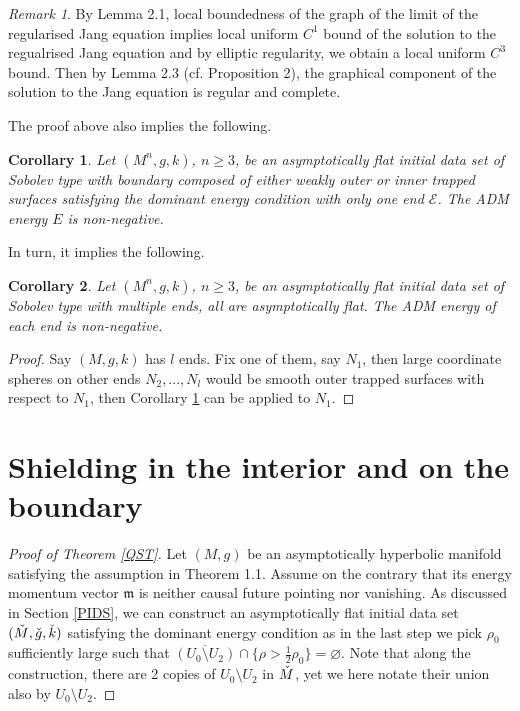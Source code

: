 \documentclass[11pt]{amsart}
\newtheorem{cor}{Corollary}[section]
\theoremstyle{remark}
\newtheorem{rem}{Remark}[section]
\numberwithin{equation}{section}
\def\m{\mathfrak{m}}
\begin{document}
{{\begin{rem}
By \cite{E10} Lemma 2.1, local boundedness of the graph of the limit of the regularised Jang equation implies local uniform $C^1$ bound of the solution to the regualrised Jang equation and by elliptic regularity, we obtain a local uniform $C^3$ bound. Then by \cite{E10} Lemma 2.3 (cf. \cite{SY2} Proposition 2), the graphical component of the solution to the Jang equation is regular and complete.  
\end{rem}

The proof above also implies the following. 
\begin{cor} \label{PET2} 
Let $(M^n,g, k)$, $n \ge 3$, be an asymptotically flat initial data set of Sobolev type with boundary composed of either weakly outer or inner trapped surfaces satisfying the dominant energy condition with only one end $\mathcal E$.  
The ADM energy $E$ is non-negative.  
\end{cor} 

In turn, it implies the following. 
\begin{cor} \label{PET3} 
Let $(M^n,g, k)$, $n \ge 3$, be an asymptotically flat initial data set of Sobolev type with multiple ends, all are asymptotically flat.   
The ADM energy of each end is non-negative.  
\end{cor} 
\begin{proof}
Say $(M,g,k)$ has $l$ ends.  Fix one of them, say $N_1$, then large coordinate spheres on other ends $N_2,...,N_l$ would be smooth outer trapped surfaces with respect to $N_1$, then Corollary \ref{PET2} can be applied to $N_1$.  
\end{proof}

\section{Shielding in the interior and on the boundary}\label{shield}
\begin{proof}[Proof of Theorem \ref{QST}]Let $(M,g)$ be an asymptotically hyperbolic manifold satisfying the assumption in Theorem 1.1. Assume on the contrary that its energy momentum vector $\m$ is neither causal future pointing nor vanishing. As discussed in Section \ref{PIDS}, we can construct an asymptotically flat initial data set $(\Check M, \Check g, \Check k)$ satisfying the dominant energy condition as in the last step we pick $\rho_0$ sufficiently large such that $\overline{(U_0\setminus U_2)} \cap \{\rho>\frac{1}{2}\rho_0\}=\varnothing$. Note that along the construction, there are 2 copies of $U_0\setminus U_2$ in $\Check M$, yet we here notate their union also by $U_0\setminus U_2$.  




\end{proof}}}
\end{document}

